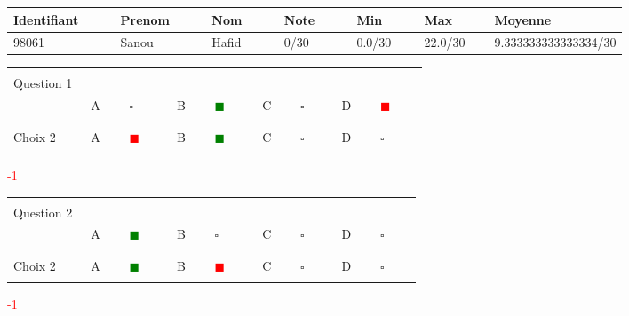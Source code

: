 \documentclass{book}%
\begin{document}
%
\normalsize%
\newpage%
\thispagestyle{empty}%
\begin{tabular}{|l|l|l|l|l|l|l| }%
\hline%
Identifiant $\qquad$ & Prenom $\qquad$ & Nom $\qquad$ & Note $\qquad$ & Min $\qquad$ & Max $\qquad$ & Moyenne $\qquad$ \\%
\hline%
98061&Sanou&Hafid&0/30&0.0/30 &22.0/30 & 9.333333333333334/30\\%
\hline%
\end{tabular}%
\thispagestyle{empty}%
\begin{center}%
\begin{tabular}{| l  l  l  l  l |}%
\hline%
 & & & & \\%
Question 1\qquad \qquad\ & & & & \\%
& A $\qquad \square \qquad$& B \textcolor{green}{$\qquad \blacksquare \qquad$}& C $\qquad \square \qquad$& D \textcolor{red}{$\qquad \blacksquare \qquad$}\\%
 & & & & \\%
\hline%
 & & & &  \\%
Choix 2& A \textcolor{red}{$\qquad \blacksquare \qquad$}& B \textcolor{green}{$\qquad \blacksquare \qquad$}& C $\qquad \square \qquad$& D $\qquad \square \qquad$\\%
 & & & &  \\%
\hline%
\end{tabular}%
 \qquad  \textcolor{red}{-1}%
\\ \vskip3mm%
\end{center}%
\thispagestyle{empty}%
\begin{center}%
\begin{tabular}{| l  l  l  l  l |}%
\hline%
 & & & & \\%
Question 2\qquad \qquad\ & & & & \\%
& A \textcolor{green}{$\qquad \blacksquare \qquad$}& B $\qquad \square \qquad$& C $\qquad \square \qquad$& D $\qquad \square \qquad$\\%
 & & & & \\%
\hline%
 & & & &  \\%
Choix 2& A \textcolor{green}{$\qquad \blacksquare \qquad$}& B \textcolor{red}{$\qquad \blacksquare \qquad$}& C $\qquad \square \qquad$& D $\qquad \square \qquad$\\%
 & & & &  \\%
\hline%
\end{tabular}%
 \qquad  \textcolor{red}{-1}%
\\ \vskip3mm%
\end{center}%
\thispagestyle{empty}%
\end{document}
